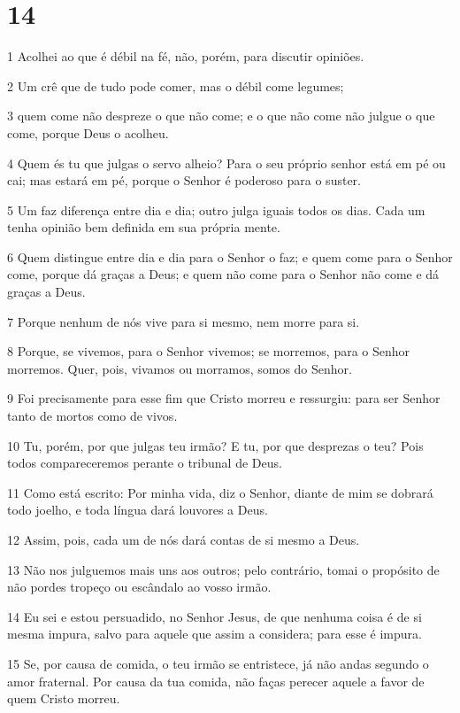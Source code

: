 \chapter{14}

\par 1 Acolhei ao que é débil na fé, não, porém, para discutir opiniões.
\par 2 Um crê que de tudo pode comer, mas o débil come legumes;
\par 3 quem come não despreze o que não come; e o que não come não julgue o que come, porque Deus o acolheu.
\par 4 Quem és tu que julgas o servo alheio? Para o seu próprio senhor está em pé ou cai; mas estará em pé, porque o Senhor é poderoso para o suster.
\par 5 Um faz diferença entre dia e dia; outro julga iguais todos os dias. Cada um tenha opinião bem definida em sua própria mente.
\par 6 Quem distingue entre dia e dia para o Senhor o faz; e quem come para o Senhor come, porque dá graças a Deus; e quem não come para o Senhor não come e dá graças a Deus.
\par 7 Porque nenhum de nós vive para si mesmo, nem morre para si.
\par 8 Porque, se vivemos, para o Senhor vivemos; se morremos, para o Senhor morremos. Quer, pois, vivamos ou morramos, somos do Senhor.
\par 9 Foi precisamente para esse fim que Cristo morreu e ressurgiu: para ser Senhor tanto de mortos como de vivos.
\par 10 Tu, porém, por que julgas teu irmão? E tu, por que desprezas o teu? Pois todos compareceremos perante o tribunal de Deus.
\par 11 Como está escrito: Por minha vida, diz o Senhor, diante de mim se dobrará todo joelho, e toda língua dará louvores a Deus.
\par 12 Assim, pois, cada um de nós dará contas de si mesmo a Deus.
\par 13 Não nos julguemos mais uns aos outros; pelo contrário, tomai o propósito de não pordes tropeço ou escândalo ao vosso irmão.
\par 14 Eu sei e estou persuadido, no Senhor Jesus, de que nenhuma coisa é de si mesma impura, salvo para aquele que assim a considera; para esse é impura.
\par 15 Se, por causa de comida, o teu irmão se entristece, já não andas segundo o amor fraternal. Por causa da tua comida, não faças perecer aquele a favor de quem Cristo morreu.
